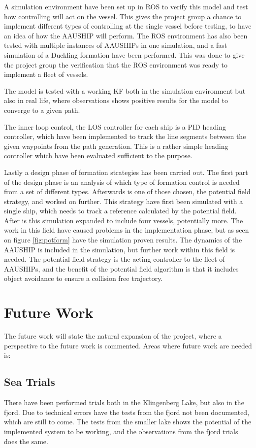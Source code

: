 A simulation environment have been set up in \ac{ROS} to verify this model and test how controlling will act on the vessel. This gives the project group a chance to implement different types of controlling at the single vessel before testing, to have an idea of how the AAUSHIP will perform. The \ac{ROS} environment has also been tested with multiple instances of AAUSHIPs in one simulation, and a fast simulation of a Duckling formation have been performed. This was done to give the project group the verification that the \ac{ROS} environment was ready to implement a fleet of vessels.

The model is tested with a working \ac{KF} both in the simulation environment but also in real life, where observations shows positive results for the model to converge to a given path.

The inner loop control, the \ac{LOS} controller for each ship is a PID heading controller, which have been implemented to track the line segments between the given waypoints from the path generation. This is a rather simple heading controller which have been evaluated sufficient to the purpose.

Lastly a design phase of formation strategies has been carried out. The first part of the design phase is an analysis of which type of formation control is needed from a set of different types. Afterwards is one of those chosen, the potential field strategy, and worked on further. This strategy have first been simulated with a single ship, which needs to track a reference calculated by the potential field. After is this simulation expanded to include four vessels, potentially more. The work in this field have caused problems in the implementation phase, but as seen on figure \ref{fig:potform} have the simulation proven results. The dynamics of the AAUSHIP is included in the simulation, but further work within this field is needed. The potential field strategy is the acting controller to the fleet of AAUSHIPs, and the benefit of the potential field algorithm is that it includes object avoidance to ensure a collision free trajectory.


\section{Future Work}
The future work will state the natural expansion of the project, where a perspective to the future work is commented. Areas where future work are needed is:

\subsection{Sea Trials}
There have been performed trials both in the Klingenberg Lake, but also in the fjord. Due to technical errors have the tests from the fjord not been documented, which are still to come. The tests from the smaller lake shows the potential of the implemented system to be working, and the observations from the fjord trials does the same.

